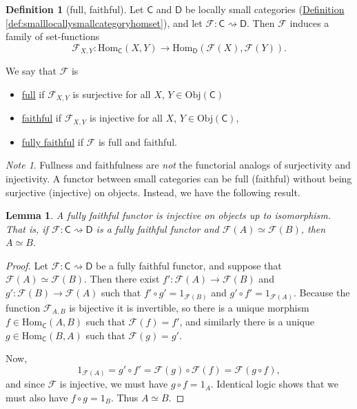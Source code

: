 \documentclass[a4paper]{report}
\newcommand{\defn}[1]{\ul{#1}}
\newcommand{\Obj}{\mathrm{Obj}}
\newcommand{\Hom}{\mathrm{Hom}}
\theoremstyle{definition}
\newtheorem{definition}{Definition}[section]
\theoremstyle{plain}
\newtheorem{lemma}{Lemma}[section]
\theoremstyle{remark}
\newtheorem{note}{Note}[section]
\begin{document}
\begin{definition}[full, faithful]
  \label{def:fullfaithfulfunctor}
  Let $\mathsf{C}$ and $\mathsf{D}$ be locally small categories (\hyperref[def:smalllocallysmallcategoryhomset]{Definition \ref*{def:smalllocallysmallcategoryhomset}}), and let $\mathcal{F}: \mathsf{C} \rightsquigarrow \mathsf{D}$. Then $\mathcal{F}$ induces a family of set-functions
  \begin{equation*}
    \mathcal{F}_{X, Y}\colon \Hom_{\mathsf{C}}(X, Y) \to \Hom_{\mathsf{D}}(\mathcal{F}(X), \mathcal{F}(Y)).
  \end{equation*}

  We say that $\mathcal{F}$ is
  \begin{itemize}
    \item \defn{full} if $\mathcal{F}_{X, Y}$ is surjective for all $X$, $Y \in \Obj(\mathsf{C})$
    \item \defn{faithful} if $\mathcal{F}_{X, Y}$ is injective for all $X$, $Y \in \Obj(\mathsf{C})$,
    \item \defn{fully faithful} if $\mathcal{F}$ is full and faithful.
  \end{itemize}
\end{definition}

\begin{note}
  Fullness and faithfulness are \emph{not} the functorial analogs of surjectivity and injectivity. A functor between small categories can be full (faithful) without being surjective (injective) on objects. Instead, we have the following result.
\end{note}

\begin{lemma}
  \label{lemma:fullyfaithfulfunctorinjectiveuptoisomorphism}
  A fully faithful functor is injective on objects up to isomorphism. That is, if $\mathcal{F}\colon \mathsf{C} \rightsquigarrow \mathsf{D}$ is a fully faithful functor and $\mathcal{F}(A) \simeq \mathcal{F}(B)$, then $A \simeq B$.
\end{lemma}
\begin{proof}
  Let $\mathcal{F}\colon \mathsf{C} \rightsquigarrow \mathsf{D}$ be a fully faithful functor, and suppose that $\mathcal{F}(A) \simeq \mathcal{F}(B)$. Then there exist $f'\colon \mathcal{F}(A) \to \mathcal{F}(B)$ and $g'\colon \mathcal{F}(B) \to \mathcal{F}(A)$ such that $f' \circ g' = 1_{\mathcal{F}(B)}$ and $g' \circ f' = 1_{\mathcal{F}(A)}$. Because the function $\mathcal{F}_{A, B}$ is bijective it is invertible, so there is a unique morphism $f \in \Hom_{\mathsf{C}}(A, B)$ such that $\mathcal{F}(f) = f'$, and similarly there is a unique $g \in \Hom_{\mathsf{C}}(B, A)$ such that $\mathcal{F}(g) = g'$.

  Now, 
  \begin{equation*}
    1_{\mathcal{F}(A)} = g' \circ f' = \mathcal{F}(g) \circ \mathcal{F}(f) = \mathcal{F}(g \circ f), 
  \end{equation*}
  and since $\mathcal{F}$ is injective, we must have $g \circ f = 1_{A}$. Identical logic shows that we must also have $f \circ g = 1_{B}$. Thus $A \simeq B$.
\end{proof}
\end{document}
